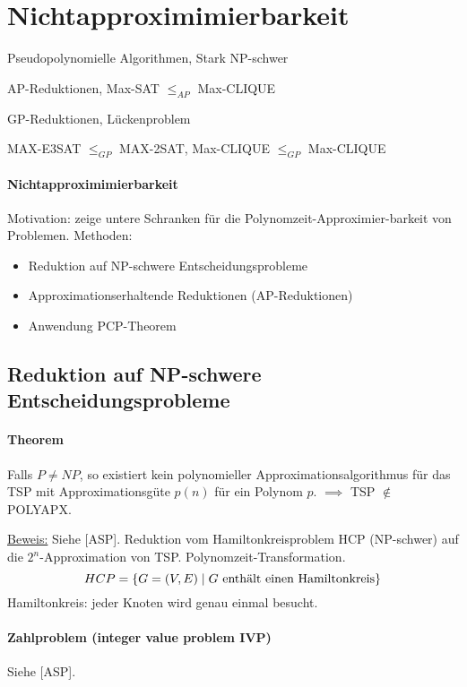 \section{Nichtapproximimierbarkeit}

\begin{takeaway}
    \item Pseudopolynomielle Algorithmen, Stark NP-schwer
    \item AP-Reduktionen, Max-SAT $\leq_{AP}$ Max-CLIQUE
    \item GP-Reduktionen, Lückenproblem
    \item MAX-E3SAT $\leq_{GP}$ MAX-2SAT, Max-CLIQUE $\leq_{GP}$ Max-CLIQUE
\end{takeaway}

\paragraph{Nichtapproximimierbarkeit}
Motivation: zeige untere Schranken für die Polynomzeit-Approximier-barkeit von Problemen.
Methoden:
\begin{itemize}
    \item Reduktion auf NP-schwere Entscheidungsprobleme
    \item Approximationserhaltende Reduktionen (AP-Reduktionen)
    \item Anwendung PCP-Theorem
\end{itemize}


\subsection{Reduktion auf NP-schwere Entscheidungsprobleme}

\paragraph{Theorem}
Falls $P \neq NP$, so existiert kein polynomieller Approximationsalgorithmus für das TSP
mit Approximationsgüte $p(n)$ für ein Polynom $p$.
$\implies$ TSP $\notin$ POLYAPX.

\underline{Beweis:}
Siehe [ASP]. Reduktion vom Hamiltonkreisproblem HCP (NP-schwer) auf die $2^n$-Approximation von TSP.
Polynomzeit-Transformation.
$$ HCP = \{ G=(V,E) \; | \; G \text{ enthält einen Hamiltonkreis} \} $$
Hamiltonkreis: jeder Knoten wird genau einmal besucht.

\paragraph{Zahlproblem (integer value problem IVP)}
Siehe [ASP].

